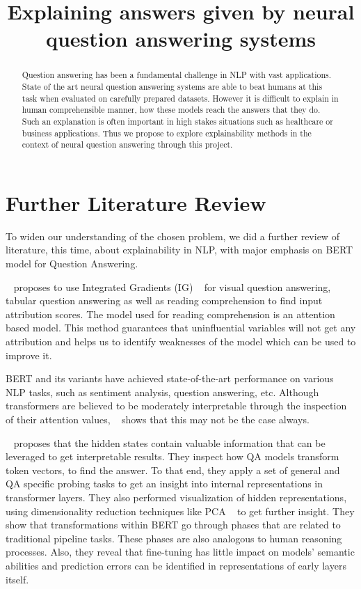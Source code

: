 \documentclass[10pt,twocolumn,letterpaper]{article}
\begin{document}
\title{Explaining answers given by neural question answering systems}


\maketitle

\begin{abstract}
Question answering has been a fundamental challenge in NLP with vast applications. State of the art neural question answering systems are able to beat humans at this task when evaluated on carefully prepared datasets. However it is difficult to explain in human comprehensible manner, how these models reach the answers that they do. Such an explanation is often important in high stakes situations such as healthcare or business applications. Thus we propose to explore explainability methods in the context of neural question answering through this project.
\end{abstract}

\section{Further Literature Review}
To widen our understanding of the chosen problem, we did a further review of literature, this time, about explainability in NLP, with major emphasis on BERT model for Question Answering.


~\cite{mudrakarta:2018} proposes to use Integrated Gradients (IG) ~\cite{IG} for visual question answering, tabular question answering as well as reading comprehension to find input attribution scores. The model used for reading comprehension is an attention based model. This method guarantees that uninfluential variables will not get any attribution and helps us to identify weaknesses of the model which can be used to improve it.


BERT and its variants have achieved state-of-the-art performance on various NLP tasks, such as sentiment analysis, question answering, etc. Although transformers are believed to be moderately interpretable through the inspection of their attention values, ~\cite{at_not_exp} shows that this may not be the case always. 

~\cite{bert_layers_qa} proposes that the hidden states contain valuable information that can be leveraged to get interpretable results. They inspect how QA models transform token vectors, to find the answer. To that end, they apply a set of general and QA specific probing tasks to get an insight into internal representations in transformer layers. They also performed visualization of hidden representations, using dimensionality reduction techniques like PCA ~\cite{PCA} to get further insight. They show that transformations within BERT go through phases that are related to traditional pipeline tasks. These phases are also analogous to human reasoning processes. Also, they reveal that fine-tuning has little impact on models' semantic abilities and prediction errors can be identified in representations of early layers itself. 
\end{document}

